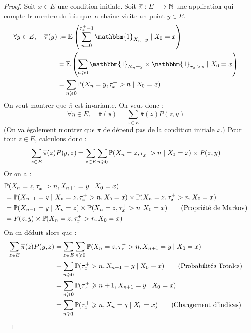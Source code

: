 \begin{proof}
    Soit $x \in E$ une condition initiale. Soit $ \overline{ \pi} : E \longrightarrow \mathbb{N}$ une application qui compte 
    le nombre de fois que la chaîne visite un point $ y \in E$. 
        \begin{align*}
            \forall y \in E, \quad \overline{ \pi}(y) &:= \mathbb{E} \left( \sum_{n=0}^{ \tau_x^+ - 1} \mathbbm{1}_{X_n = y} \; | \; X_0 = x \right) \\ 
            & = \mathbb{E} \left( \sum_{n \geqslant 0} \mathbbm{1}_{X_n = y} \times \mathbbm{1}_{ \tau_x^+ > n} \; | \; X_0 = x \right) \\ 
            &= \sum_{n \geqslant 0} \myP(X_n = y, \tau_x^+ > n \; | \; X_0 = x)  
        \end{align*}
    On veut montrer que $ \overline{ \pi}$ est invariante.  On veut donc : 
        \[ \forall y \in E, \quad \overline{ \pi}(y) = \sum_{z \in E} \overline{ \pi}(z) P(z, y) \]
    (On va également montrer que $ \overline{ \pi}$ de dépend pas de la condition initiale $x$.)
    Pour tout $z \in E$, calculons donc : 
        \[ \sum_{z \in E} \overline{ \pi}(z) P(y,z) = \sum_{ z \in E} \sum_{n \geqslant 0} \mathbb{P}(X_n = z, \tau_x^+ > n \; | \; X_0 = x) \times P(z,y)  \] 
    Or on a : 
        \begin{align*}
            & \mathbb{P}(X_n = z, \tau_x^+ > n, X_{n+1} = y \; | \; X_0 = x) \\
            &= \mathbb{P}(X_{n+1} = y \; | \; X_n = z, \tau_x^+ > n, X_0 = x) \times \mathbb{P}(X_n = z, \tau_x^+ > n, X_0 = x) \\
            &= \mathbb{P}(X_{n+1} = y \; | \; X_n = z) \times \mathbb{P}(X_n = z, \tau_x^+ > n, X_0 = x) \quad \quad \text{(Propriété de Markov)} \\ 
            &= P(z,y) \times \mathbb{P}(X_n = z, \tau_x^+ > n, X_0 = x) 
        \end{align*}
    On en déduit alors que : 
        \begin{align*}
            \sum_{z \in E} \overline{ \pi}(z) P(y,z) &= \sum_{z \in E} \sum_{n \geqslant 0} \myP(X_n = z, \tau_x^+ > n, X_{n+1} = y \; | \; X_0 = x) \\ 
            &= \sum_{ n \geqslant 0} \myP(\tau_x^+ > n, X_{n+1} = y \; | \; X_0 = x) \quad \quad \text{(Probabilités Totales)} \\ 
            &= \sum_{ n \geqslant 0} \myP(\tau_x^+ \geqslant n +1, X_{n+1} = y \; | \; X_0 = x) \\ 
            &= \sum_{n \geqslant 1} \myP(\tau_x^+ \geqslant n, X_{n} = y \; | \; X_0 = x) \quad \quad \text{(Changement d'indices)} \\ 

\end{align*}
\end{proof}
